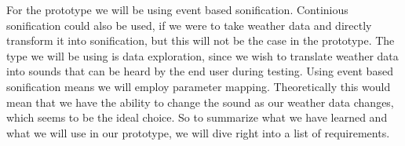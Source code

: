 

For the prototype we will be using event based sonification. 
Continious sonification could also be used, if we were to take weather data and directly transform it into sonification, but this will not be the case in the prototype. 
The type we will be using is data exploration, since we wish to translate weather data into sounds that can be heard by the end user during testing.
Using event based sonification means we will employ parameter mapping. 
Theoretically this would mean that we have the ability to change the sound as our weather data changes, which seems to be the ideal choice.
So to summarize what we have learned and what we will use in our prototype, we will dive right into a list of requirements.

